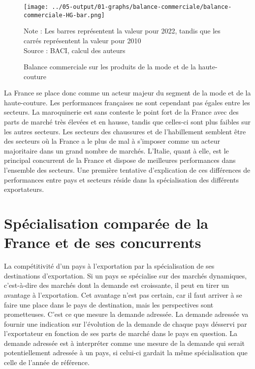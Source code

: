 \documentclass[french,10pt,a4paper]{article}
\begin{document}
\begin{figure}[!h]
  \centering
  \texttt{[image: ../05-output/01-graphs/balance-commerciale/balance-commerciale-HG-bar.png]}
  \captionsetup{justification=justified, singlelinecheck=false, font=small}
  \caption*{Note : Les barres représentent la valeur pour 2022, tandis que les carrés représentent la valeur pour 2010 \\
  Source : BACI, calcul des auteurs}
  \captionsetup{justification=centering, singlelinecheck=true, font=normalsize}
  \caption{Balance commerciale sur les produits de la mode et de la haute-couture}
  \label{fig:balance-commerciale}
\end{figure}

\bigskip

La France se place donc comme un acteur majeur du segment de la mode et de la haute-couture. Les performances françaises ne sont cependant pas égales entre les secteurs. La maroquinerie est sans conteste le point fort de la France avec des parts de marché très élevées et en hausse, tandis que celles-ci sont plus faibles sur les autres secteurs. Les secteurs des chaussures et de l'habillement semblent être des secteurs où la France a le plus de mal à s'imposer comme un acteur majoritaire dans un grand nombre de marchés. L'Italie, quant à elle, est le principal concurrent de la France et dispose de meilleures performances dans l'ensemble des secteurs. Une première tentative d'explication de ces différences de performances entre pays et secteurs réside dans la spécialisation des différents exportateurs.


\section{Spécialisation comparée de la France et de ses concurrents}
La compétitivité d'un pays à l'exportation par la spécialisation de ses destinations d'exportation. Si un pays se spécialise sur des marchés dynamiques, c'est-à-dire des marchés dont la demande est croissante, il peut en tirer un avantage à l'exportation. Cet avantage n'est pas certain, car il faut arriver à se faire une place dans le pays de destination, mais les perspectives sont prometteuses. C'est ce que mesure la demande adressée. La demande adressée va fournir une indication sur l'évolution de la demande de chaque pays désservi par l'exportateur en fonction de ses parts de marché dans le pays en question. La demande adressée est à interpréter comme une mesure de la demande qui serait potentiellement adressée à un pays, si celui-ci gardait la même spécialisation que celle de l'année de référence.
\end{document}
